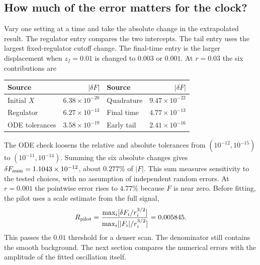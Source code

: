 \clearpage\subsection{How much of the error matters for the clock?}
Vary one setting at a time and take the absolute change in the extrapolated result. The regulator entry compares the two intercepts. The tail entry uses the largest fixed-regulator cutoff change. The final-time entry is the larger displacement when $z_f=0.01$ is changed to $0.003$ or $0.001$. At $r=0.03$ the six contributions are
\begin{center}\begin{tabular}{lr@{\qquad}lr}\toprule Source & $|\delta F|$ & Source & $|\delta F|$\\\midrule
Initial $X$ & $6.38\times10^{-20}$ & Quadrature & $9.47\times10^{-22}$\\
Regulator & $6.27\times10^{-13}$ & Final time & $4.77\times10^{-13}$\\
ODE tolerances & $3.58\times10^{-19}$ & Early tail & $2.41\times10^{-16}$\\\bottomrule\end{tabular}\end{center}
The ODE check loosens the relative and absolute tolerances from $(10^{-12},10^{-15})$ to $(10^{-11},10^{-14})$. Summing the six absolute changes gives $\delta F_{\rm num}=1.1043\times10^{-12}$, about $0.277\%$ of $|F|$. This sum measures sensitivity to the tested choices, with no assumption of independent random errors.
At $r=0.001$ the pointwise error rises to $4.77\%$ because $F$ is near zero. Before fitting, the pilot uses a scale estimate from the full signal,
\[
 R_{\rm pilot}=\frac{\max_i[\delta F_i/r_i^{3/2}]}{\max_i[|F_i|/r_i^{3/2}]}=0.005845.
\]
This passes the $0.01$ threshold for a denser scan. The denominator still contains the smooth background. The next section compares the numerical errors with the amplitude of the fitted oscillation itself.
